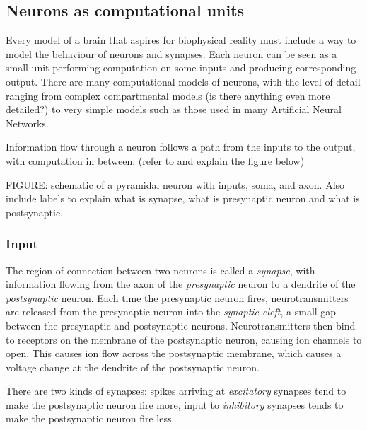 \documentclass[a4paper,12pt]{report}
\theoremstyle{definition}
\begin{document}
\subsection{Neurons as computational units}
Every model of a brain that aspires for biophysical reality must include a way to model the behaviour of neurons and synapses. Each neuron can be seen as a small unit performing computation on some inputs and producing corresponding output. There are many computational models of neurons, with the level of detail ranging from complex compartmental models (is there anything even more detailed?) to very simple models such as those used in many Artificial Neural Networks. 

Information flow through a neuron follows a path from the inputs to the output, with computation in between. (refer to and explain the figure below)

FIGURE: schematic of a pyramidal neuron with inputs, soma, and axon. Also include labels to explain what is synapse, what is presynaptic neuron and what is postsynaptic.

\subsubsection{Input}

The region of connection between two neurons is called a \emph{synapse}, with information flowing from the axon of the \emph{presynaptic} neuron to a dendrite of the \emph{postsynaptic} neuron. Each time the presynaptic neuron fires, neurotransmitters are released from the presynaptic neuron into the \emph{synaptic cleft}, a small gap between the presynaptic and postsynaptic neurons.
Neurotransmitters then bind to receptors on the membrane of the postsynaptic neuron, causing ion channels to open. This causes ion flow across the postsynaptic membrane, which causes a voltage change at the dendrite of the postsynaptic neuron.

There are two kinds of synapses: spikes arriving at \emph{excitatory} synapses tend to make the postsynaptic neuron fire more, input to \emph{inhibitory} synapses tends to make the postsynaptic neuron fire less.

\end{document}
